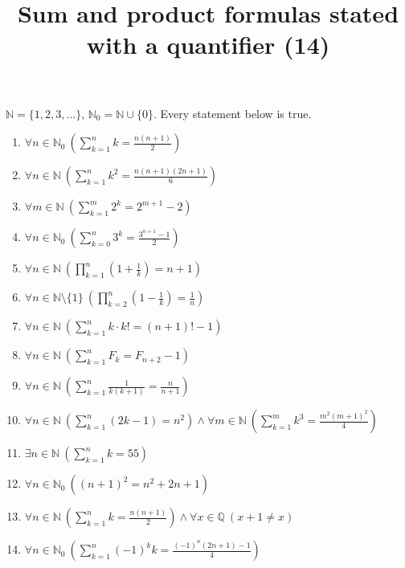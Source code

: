 \documentclass[11pt,a4paper]{article}
\title{Sum and product formulas stated with a quantifier (14)}
\author{}
\date{}
\begin{document}
\maketitle
$\mathbb{N} = \{1, 2, 3, \ldots\}$, $\mathbb{N}_{0} = \mathbb{N} \cup \{0\}$. Every statement below is true.

\begin{enumerate}
\item $\displaystyle \forall n \in \mathbb{N}_{0}\ \left(\sum_{k=1}^{n} k = \frac{n\left(n + 1\right)}{2}\right)$
\item $\displaystyle \forall n \in \mathbb{N}\ \left(\sum_{k=1}^{n} k^{2} = \frac{n\left(n + 1\right)\left(2n + 1\right)}{6}\right)$
\item $\displaystyle \forall m \in \mathbb{N}\ \left(\sum_{k=1}^{m} 2^{k} = 2^{m + 1} - 2\right)$
\item $\displaystyle \forall n \in \mathbb{N}_{0}\ \left(\sum_{k=0}^{n} 3^{k} = \frac{3^{n + 1} - 1}{2}\right)$
\item $\displaystyle \forall n \in \mathbb{N}\ \left(\prod_{k=1}^{n} \left(1 + \frac{1}{k}\right) = n + 1\right)$
\item $\displaystyle \forall n \in \mathbb{N} \setminus \{1\}\ \left(\prod_{k=2}^{n} \left(1 - \frac{1}{k}\right) = \frac{1}{n}\right)$
\item $\displaystyle \forall n \in \mathbb{N}\ \left(\sum_{k=1}^{n} k \cdot k! = \left(n + 1\right)! - 1\right)$
\item $\displaystyle \forall n \in \mathbb{N}\ \left(\sum_{k=1}^{n} F_{k} = F_{n + 2} - 1\right)$
\item $\displaystyle \forall n \in \mathbb{N}\ \left(\sum_{k=1}^{n} \frac{1}{k\left(k + 1\right)} = \frac{n}{n + 1}\right)$
\item $\displaystyle \forall n \in \mathbb{N}\ \left(\sum_{k=1}^{n} \left(2k - 1\right) = n^{2}\right) \land \forall m \in \mathbb{N}\ \left(\sum_{k=1}^{m} k^{3} = \frac{m^{2}\left(m + 1\right)^{2}}{4}\right)$
\item $\displaystyle \exists n \in \mathbb{N}\ \left(\sum_{k=1}^{n} k = 55\right)$
\item $\displaystyle \forall n \in \mathbb{N}_{0}\ \left(\left(n + 1\right)^{2} = n^{2} + 2n + 1\right)$
\item $\displaystyle \forall n \in \mathbb{N}\ \left(\sum_{k=1}^{n} k = \frac{n\left(n + 1\right)}{2}\right) \land \forall x \in \mathbb{Q}\ (x + 1 \neq x)$
\item $\displaystyle \forall n \in \mathbb{N}_{0}\ \left(\sum_{k=1}^{n} \left(-1\right)^{k} k = \frac{\left(-1\right)^{n}\left(2n + 1\right) - 1}{4}\right)$
\end{enumerate}
\end{document}
